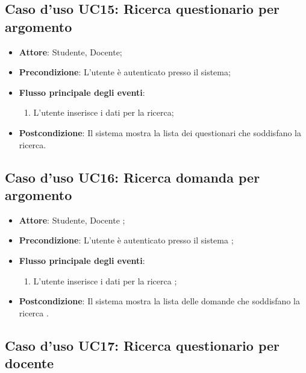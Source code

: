\documentclass[12pt,a4paper]{article}
\begin{document}
\subsection{Caso d'uso UC15: Ricerca questionario per argomento}

\begin{itemize}

\item \textbf{Attore}: Studente, Docente; 
\item \textbf{Precondizione}: L'utente è autenticato presso il sistema;

\item \textbf{Flusso principale degli eventi}:
\begin{enumerate}
	\item L'utente inserisce i dati per la ricerca;
	
\end{enumerate}
\item \textbf{Postcondizione}: Il sistema mostra la lista dei questionari che soddisfano la ricerca.
\end{itemize}
\hypertarget{UC16}{}
\subsection{Caso d'uso UC16: Ricerca domanda per argomento}

\begin{itemize}

\item \textbf{Attore}: Studente, Docente
; 
\item \textbf{Precondizione}: L'utente è autenticato presso il sistema
;

\item \textbf{Flusso principale degli eventi}:
\begin{enumerate}
	\item L'utente inserisce i dati per la ricerca	;
	
\end{enumerate}
\item \textbf{Postcondizione}: Il sistema mostra la lista delle domande che soddisfano la ricerca
.
\end{itemize}
\hypertarget{UC17}{}
\subsection{Caso d'uso UC17: Ricerca questionario per docente}
\end{document}
